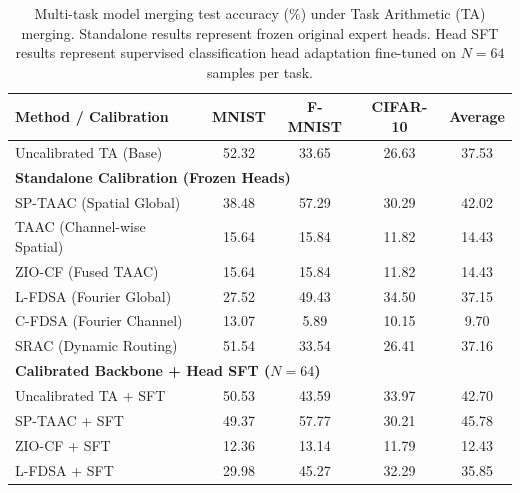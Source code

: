\documentclass{article}
\theoremstyle{plain}
\theoremstyle{definition}
\theoremstyle{remark}
\begin{document}
\begin{table}[h]
\caption{Multi-task model merging test accuracy (\%) under Task Arithmetic (TA) merging. Standalone results represent frozen original expert heads. Head SFT results represent supervised classification head adaptation fine-tuned on $N=64$ samples per task.}
\label{tab:ta_main_results}
\vskip 0.1in
\centering
\begin{footnotesize}
\begin{tabular}{lcccc}
\toprule
Method / Calibration & MNIST & F-MNIST & CIFAR-10 & Average \\
\midrule
Uncalibrated TA (Base) & 52.32 & 33.65 & 26.63 & 37.53 \\
\midrule
\multicolumn{5}{l}{\textbf{Standalone Calibration (Frozen Heads)}} \\
SP-TAAC (Spatial Global) & 38.48 & 57.29 & 30.29 & 42.02 \\
TAAC (Channel-wise Spatial) & 15.64 & 15.84 & 11.82 & 14.43 \\
ZIO-CF (Fused TAAC) & 15.64 & 15.84 & 11.82 & 14.43 \\
L-FDSA (Fourier Global) & 27.52 & 49.43 & 34.50 & 37.15 \\
C-FDSA (Fourier Channel) & 13.07 & 5.89 & 10.15 & 9.70 \\
SRAC (Dynamic Routing) & 51.54 & 33.54 & 26.41 & 37.16 \\
\midrule
\multicolumn{5}{l}{\textbf{Calibrated Backbone + Head SFT ($N=64$)}} \\
Uncalibrated TA + SFT & 50.53 & 43.59 & 33.97 & 42.70 \\
SP-TAAC + SFT & 49.37 & 57.77 & 30.21 & 45.78 \\
ZIO-CF + SFT & 12.36 & 13.14 & 11.79 & 12.43 \\
L-FDSA + SFT & 29.98 & 45.27 & 32.29 & 35.85 \\
\bottomrule
\end{tabular}
\end{footnotesize}
\vskip -0.1in
\end{table}
\end{document}
